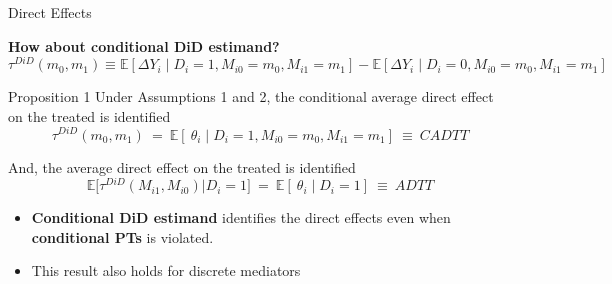 \documentclass[aspectratio=1610, 9pt]{beamer}
\begin{document}
\begin{frame}{Direct Effects}

\textbf{How about conditional DiD estimand?}\\
\vspace{0.1cm}
$$\tau^{DiD}(m_0,m_1)\equiv \mathbb E[\Delta Y_i \mid D_i=1, M_{i0}=m_0, M_{i1}=m_1]- \mathbb E[\Delta Y_i \mid D_i=0, M_{i0}=m_0, M_{i1}=m_1]$$ 
 

 

\pause

\begin{block}{Proposition 1}
    Under Assumptions 1 and 2, the conditional average direct effect on the treated is identified
   $$   \tau^{DiD}(m_0,m_1)
    \ = \ \mathbb{E} [\ \theta_i\mid D_i=1, M_{i0}=m_0,M_{i1}=m_1]\ \equiv \ CADTT $$

 And, the average direct effect on the treated is identified
    $$ \mathbb{E}\big[ \tau^{DiD}(M_{i1},M_{i0}) \big| D_i =1\big]
    \ =  \ \mathbb{E} [\ \theta_i\mid D_i=1] \ \equiv \ ADTT $$
\end{block}

\begin{itemize}
    \item \textbf{Conditional DiD estimand} identifies the direct effects even when \textbf{conditional PTs} is violated.
    \item This result also holds for discrete mediators
\end{itemize}
\end{frame}
\end{document}
